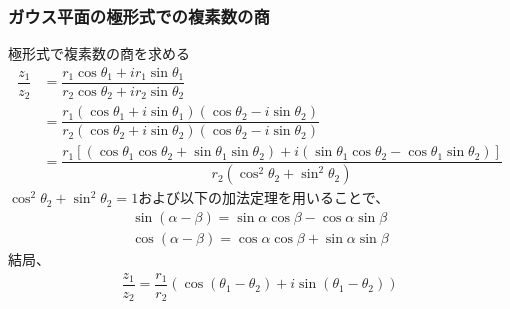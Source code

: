 \documentclass[unicode,12pt,aspectratio=169]{beamer}
\begin{document}
\begin{frame}
	\frametitle{ガウス平面の極形式での複素数の商}
		\footnotesize
			極形式で複素数の商を求める
			\begin{align*}
				\dfrac{z_1}{z_2}&=\dfrac{r_1\cos\theta_1+i r_1\sin\theta_1}{r_2\cos\theta_2+i r_2\sin\theta_2}\\
				&=\dfrac{r_1(\cos\theta_1+i\sin\theta_1)(\cos\theta_2-i\sin\theta_2)}{r_2(\cos\theta_2+i\sin\theta_2)(\cos\theta_2-i\sin\theta_2)}\\
				&=\dfrac{r_1[(\cos\theta_1\cos\theta_2 +\sin\theta_1 \sin\theta_2)+i(\sin\theta_1\cos\theta_2-\cos\theta_1 \sin\theta_2)]}{r_2(\cos^2\theta_2+\sin^2\theta_2)}
			\end{align*}
			$\cos^2\theta_2+\sin^2\theta_2=1$および以下の加法定理を用いることで、
			\begin{align*}
				\sin(\alpha-\beta)=\sin\alpha\cos\beta-\cos\alpha\sin\beta\\
				\cos(\alpha-\beta)=\cos\alpha\cos\beta+\sin\alpha\sin\beta
			\end{align*}
			結局、
			\begin{align*}
				\dfrac{z_1}{z_2}=\dfrac{r_1}{r_2} \left(\cos(\theta_1-\theta_2)+i\sin(\theta_1-\theta_2)\right)
			\end{align*}
\end{frame}
\end{document}

